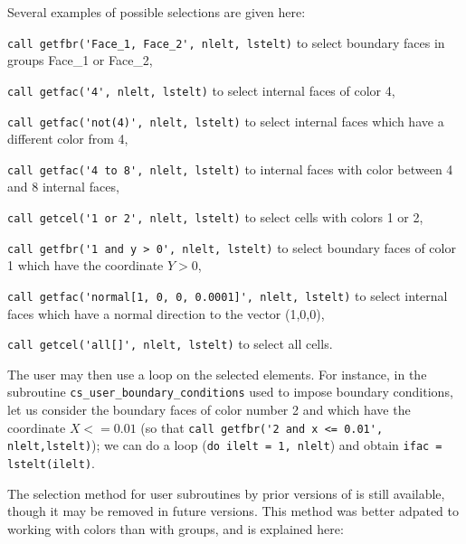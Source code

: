 {{{Several examples of possible selections are given here:
\begin{list}{-}{}
\item \verb+call getfbr('Face_1, Face_2', nlelt, lstelt)+ to select
  boundary faces in groups Face\_1 or Face\_2,  
\item \verb+call getfac('4', nlelt, lstelt)+ to select internal
  faces of color 4,
\item \verb+call getfac('not(4)', nlelt, lstelt)+ to select internal
  faces which have a different color from 4,
\item \verb+call getfac('4 to 8', nlelt, lstelt)+ to internal faces
with color between 4 and 8 internal faces,
\item \verb+call getcel('1 or 2', nlelt, lstelt)+ to select cells
  with colors 1 or 2,
\item \verb+call getfbr('1 and y > 0', nlelt, lstelt)+ to select boundary
  faces of color 1 which have the coordinate $Y > 0$,
\item \verb+call getfac('normal[1, 0, 0, 0.0001]', nlelt, lstelt)+ to select
internal faces which have a normal direction to the vector (1,0,0),  
\item \verb+call getcel('all[]', nlelt, lstelt)+ to select all cells.
\end{list}

The user may then use a loop on the selected elements.
For instance, in the subroutine \texttt{cs\_user\_boundary\_conditions} used to impose
boundary  conditions, let us consider the boundary faces of color
number 2 and which have the coordinate $X <= 0.01$ (so
that \verb+call getfbr('2 and x <= 0.01', nlelt,lstelt)+);
we can do a loop (\verb+do ilelt = 1, nlelt+) and
obtain \verb+ifac = lstelt(ilelt)+.


The selection method for user subroutines by prior versions of \CS
is still available, though it may be removed in future versions.
This method was better adpated to working with colors than with groups,
and is explained here:

}}}
